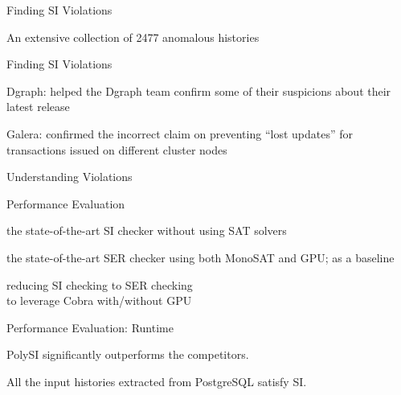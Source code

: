 \begin{frame}{Finding SI Violations}
	\begin{center}
		{}
		\vspace{0.60cm}

		An extensive collection of 2477 anomalous histories \\[2pt]
	\end{center}
\end{frame}

\begin{frame}{Finding SI Violations}
	\begin{center}
		Dgraph: helped the Dgraph team confirm some of their suspicions
		  about their latest release

		\vspace{0.50cm}
		{}
		\vspace{0.50cm}

		Galera: confirmed the incorrect claim on preventing ``lost updates''
		  for transactions issued on different cluster nodes
	\end{center}
\end{frame}

\begin{frame}{Understanding Violations}
\end{frame}

\begin{frame}{Performance Evaluation}
	\begin{description}
		\setlength{\itemsep}{15pt}
		\item[dbcop~\ncite{Complexity:OOPSLA2019}:]
			the state-of-the-art SI checker without using SAT solvers
		\item[Cobra~\ncite{Cobra:OSDI2020}:]
		  the state-of-the-art SER checker using both MonoSAT and GPU;
			as a baseline
		\item[CobraSI:] reducing SI checking to SER checking \\
		   to leverage Cobra with/without GPU
	\end{description}
\end{frame}

\begin{frame}{Performance Evaluation: Runtime}
	\centerline{PolySI significantly outperforms the competitors.}


	\centerline{All the input histories extracted from PostgreSQL satisfy SI.}
\end{frame}

